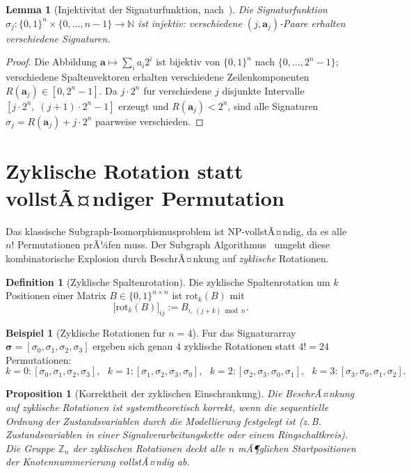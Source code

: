 ﻿\documentclass[12pt, a4paper, titlepage]{report}
\newtheorem{lemma}[theorem]{Lemma}
\newtheorem{proposition}[theorem]{Proposition}
\theoremstyle{definition}
\newtheorem{definition}[theorem]{Definition}
\newtheorem{example}[theorem]{Beispiel}
\theoremstyle{remark}
\begin{document}
\begin{lemma}[Injektivitat der Signaturfunktion, nach~\citep{epp2026subgraph}]
\label{lem:injektivitaet}
Die Signaturfunktion $\sigma_j : \{0,1\}^n \times \{0,\ldots,n-1\} \to \mathbb{N}$
ist injektiv: verschiedene $(j, \bm{a}_j)$-Paare erhalten verschiedene Signaturen.
\end{lemma}

\begin{proof}
Die Abbildung $\bm{a} \mapsto \sum_i a_i 2^i$ ist bijektiv von $\{0,1\}^n$ nach
$\{0,\ldots,2^n-1\}$; verschiedene Spaltenvektoren erhalten verschiedene
Zeilenkomponenten $R(\bm{a}_j) \in [0, 2^n - 1]$.
Da $j \cdot 2^n$ fur verschiedene $j$ disjunkte Intervalle
$[j \cdot 2^n,\; (j+1) \cdot 2^n - 1]$ erzeugt und $R(\bm{a}_j) < 2^n$, sind
alle Signaturen $\sigma_j = R(\bm{a}_j) + j \cdot 2^n$ paarweise verschieden.
\end{proof}

\section{Zyklische Rotation statt vollstÃ¤ndiger Permutation}

Das klassische Subgraph-Isomorphismusproblem ist NP-vollstÃ¤ndig, da es alle $n!$
Permutationen prÃ¼fen muss. Der Subgraph Algorithmus~\citep{epp2026subgraph} umgeht
diese kombinatorische Explosion durch BeschrÃ¤nkung auf \emph{zyklische} Rotationen.

\begin{definition}[Zyklische Spaltenrotation]
\label{def:zyklrot}
Die zyklische Spaltenrotation um $k$ Positionen einer Matrix $B \in \{0,1\}^{n \times n}$
ist $\mathrm{rot}_k(B)$ mit
\begin{equation}
  \bigl[\mathrm{rot}_k(B)\bigr]_{ij} := B_{i,\,(j+k) \bmod n}.
  \label{eq:zyklrot}
\end{equation}
\end{definition}

\begin{example}[Zyklische Rotationen fur $n=4$]
Fur das Signaturarray $\bm{\sigma} = [\sigma_0, \sigma_1, \sigma_2, \sigma_3]$
ergeben sich genau $4$ zyklische Rotationen statt $4! = 24$ Permutationen:
\[
  k=0: [\sigma_0,\sigma_1,\sigma_2,\sigma_3], \text{ }
  k=1: [\sigma_1,\sigma_2,\sigma_3,\sigma_0], \text{ }
  k=2: [\sigma_2,\sigma_3,\sigma_0,\sigma_1], \text{ }
  k=3: [\sigma_3,\sigma_0,\sigma_1,\sigma_2].
\]
\end{example}

\begin{proposition}[Korrektheit der zyklischen Einschrankung]
\label{satz:zyklkorrekt}
Die BeschrÃ¤nkung auf zyklische Rotationen ist systemtheoretisch korrekt, wenn die
sequentielle Ordnung der Zustandsvariablen durch die Modellierung festgelegt ist
(z.\,B. Zustandsvariablen in einer Signalverarbeitungskette oder einem Ringschaltkreis).
Die Gruppe $\mathbb{Z}_n$ der zyklischen Rotationen deckt alle $n$ mÃ¶glichen
Startpositionen der Knotennummerierung vollstÃ¤ndig ab.
\end{proposition}
\end{document}
